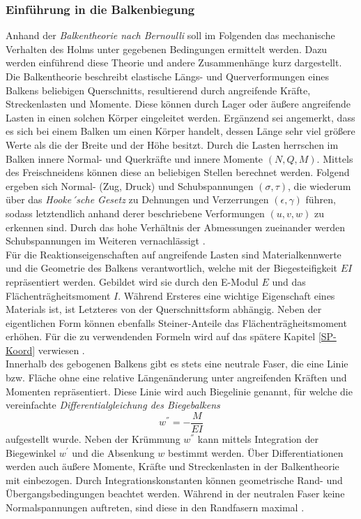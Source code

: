 \subsubsection{Einführung in die Balkenbiegung}
Anhand der \textit{Balkentheorie nach Bernoulli} soll im Folgenden das mechanische Verhalten des Holms unter gegebenen Bedingungen ermittelt werden. Dazu werden einführend diese Theorie und andere Zusammenhänge kurz dargestellt.\\

\noindent Die Balkentheorie beschreibt elastische Längs- und Querverformungen eines Balkens beliebigen Querschnitts, resultierend durch angreifende Kräfte, Streckenlasten und Momente. Diese können durch Lager oder äußere angreifende Lasten in einen solchen Körper eingeleitet werden. Ergänzend sei angemerkt, dass es sich bei einem Balken um einen Körper handelt, dessen Länge sehr viel größere Werte als die der Breite und der Höhe besitzt. Durch die Lasten herrschen im Balken innere Normal- und Querkräfte und innere Momente $(N, Q, M)$. Mittels des Freischneidens können diese an beliebigen Stellen berechnet werden. Folgend ergeben sich Normal- (Zug, Druck) und Schubspannungen $(\sigma, \tau)$, die wiederum über das \textit{Hooke´sche Gesetz} zu Dehnungen und Verzerrungen $(\epsilon, \gamma)$ führen, sodass letztendlich anhand derer beschriebene Verformungen $(u, v, w)$ zu erkennen sind. Durch das hohe Verhältnis der Abmessungen zueinander werden Schubspannungen im Weiteren vernachlässigt \cite{item15}\cite{item16}\cite{item9}. \\

\noindent Für die Reaktionseigenschaften auf angreifende Lasten sind Materialkennwerte und die Geometrie des Balkens verantwortlich, welche mit der Biegesteifigkeit $EI$ repräsentiert werden. Gebildet wird sie durch den E-Modul $E$ und das Flächenträgheitsmoment $I$. Während Ersteres eine wichtige Eigenschaft eines Materials ist, ist Letzteres von der Querschnittsform abhängig. Neben der eigentlichen Form können ebenfalls Steiner-Anteile das Flächenträgheitsmoment erhöhen. Für die zu verwendenden Formeln wird auf das spätere Kapitel \ref{SP-Koord} verwiesen \cite{item16}.\\


\noindent Innerhalb des gebogenen Balkens gibt es stets eine neutrale Faser, die eine Linie bzw. Fläche ohne eine relative Längenänderung unter angreifenden Kräften und Momenten repräsentiert. Diese Linie wird auch Biegelinie genannt, für welche die vereinfachte \textit{Differentialgleichung des Biegebalkens}
\begin{equation}
	w^{''}=-\frac{M}{EI}
\end{equation}
aufgestellt wurde. Neben der Krümmung $w^{''}$ kann mittels Integration der Biegewinkel $w^{'}$ und die Absenkung $w$ bestimmt werden. Über Differentiationen werden auch äußere Momente, Kräfte und Streckenlasten in der Balkentheorie mit einbezogen. Durch Integrationskonstanten können geometrische Rand- und Übergangsbedingungen beachtet werden. Während in der neutralen Faser keine Normalspannungen auftreten, sind diese in den Randfasern maximal \cite{item16}\cite{item9}.\\


